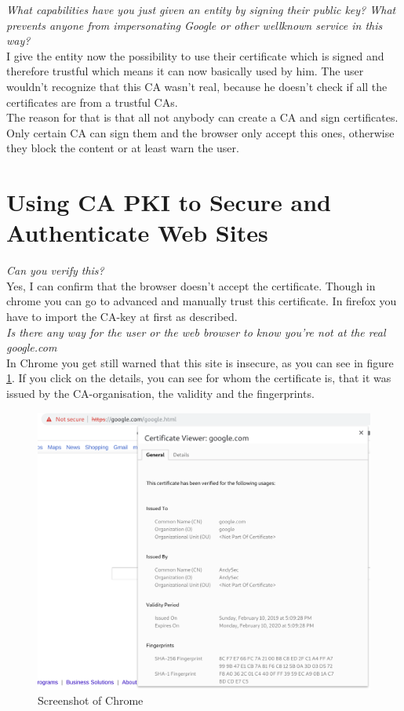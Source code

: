 \textit{What capabilities have you just given an entity by signing their public key? What prevents anyone from impersonating Google or other wellknown service in this way?}\\
I give the entity now the possibility to use their certificate which is signed and therefore trustful which means it can now basically used by him. The user wouldn't recognize that this CA wasn't real, because he doesn't check if all the certificates are from a trustful CAs.\\
The reason for that is that all not anybody can create a CA and sign certificates. Only certain CA can sign them and the browser only accept this ones, otherwise they block the content or at least warn the user.


\section{Using CA PKI to Secure and Authenticate Web Sites} \label{t2}
\textit{Can you verify this?}\\
Yes, I can confirm that the browser doesn't accept the certificate. Though in chrome you can go to advanced and manually trust this certificate. In firefox you have to import the CA-key at first as described.\\

\textit{Is there any way for the user or the web browser to know you're not at the real google.com}\\
In Chrome you get still warned that this site is insecure, as you can see in figure \ref{fig:chrome}. If you click on the details, you can see for whom the certificate is, that it was issued by the CA-organisation, the validity and the fingerprints.

\begin{figure}[htp]
    \centering
    \caption{Screenshot of Chrome}
    \label{fig:chrome}
    \includegraphics[width=\textwidth]{chrome.png}
\end{figure}

